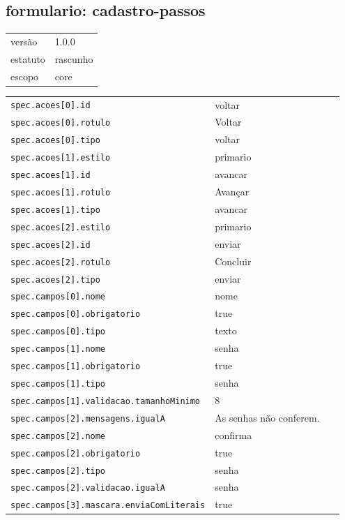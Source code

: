 \subsection*{formulario: cadastro-passos}
\begin{tabular}{@{}ll@{}}
versão & 1.0.0 \\
estatuto & rascunho \\
escopo & core \\
\end{tabular}

\begin{tabular}{@{}p{0.35\linewidth}p{0.6\linewidth}@{}}
\texttt{spec.acoes[0].id} & voltar \\
\texttt{spec.acoes[0].rotulo} & Voltar \\
\texttt{spec.acoes[0].tipo} & voltar \\
\texttt{spec.acoes[1].estilo} & primario \\
\texttt{spec.acoes[1].id} & avancar \\
\texttt{spec.acoes[1].rotulo} & Avançar \\
\texttt{spec.acoes[1].tipo} & avancar \\
\texttt{spec.acoes[2].estilo} & primario \\
\texttt{spec.acoes[2].id} & enviar \\
\texttt{spec.acoes[2].rotulo} & Concluir \\
\texttt{spec.acoes[2].tipo} & enviar \\
\texttt{spec.campos[0].nome} & nome \\
\texttt{spec.campos[0].obrigatorio} & true \\
\texttt{spec.campos[0].tipo} & texto \\
\texttt{spec.campos[1].nome} & senha \\
\texttt{spec.campos[1].obrigatorio} & true \\
\texttt{spec.campos[1].tipo} & senha \\
\texttt{spec.campos[1].validacao.tamanhoMinimo} & 8 \\
\texttt{spec.campos[2].mensagens.igualA} & As senhas não conferem. \\
\texttt{spec.campos[2].nome} & confirma \\
\texttt{spec.campos[2].obrigatorio} & true \\
\texttt{spec.campos[2].tipo} & senha \\
\texttt{spec.campos[2].validacao.igualA} & senha \\
\texttt{spec.campos[3].mascara.enviaComLiterais} & true \\

\end{tabular}
